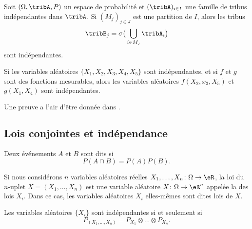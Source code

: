 \begin{lemma}  \label{LemHOjqqw}
    Soit \( (\Omega,\tribA,P)\) un espace de probabilité et \( (\tribA)_{i\in I}\) une famille de tribus indépendantes dans \( \tribA\). Si \( (M_j)_{j\in J}\) est une partition de \( I\), alors les tribus
    \begin{equation}
        \tribB_j=\sigma\big( \bigcup_{i\in M_j}\tribA_i \big)
    \end{equation}
    sont indépendantes.

    Si les variables aléatoires \( \{ X_1,X_2,X_3,X_4,X_5 \}\) sont indépendantes, et si \( f\) et \( g\) sont des fonctions mesurables, alors les variables aléatoires \( f(X_2,x_3,X_5)\) et \( g(X_1,X_4)\) sont indépendantes.
\end{lemma}
Une preuve a l'air d'être donnée dans \cite{VincentBa}.

\subsection{Lois conjointes et indépendance}

\begin{definition}
    Deux événements \( A\) et \( B\) sont dits  si
    \begin{equation}
        P(A\cap B)=P(A)P(B).
    \end{equation}
\end{definition}
Si nous considérons \( n\) variables aléatoires réelles \( X_1,\ldots,X_n\colon\Omega\to\eR\), la loi du \( n\)-uplet \( X=(X_1,\ldots,X_n)\) est une variable aléatoire \( X\colon \Omega\to \eR^n\) appelée la  des lois \( X_i\). Dans ce cas, les variables aléatoires \( X_i\) elles-mêmes sont dites lois  de \( X\).

\begin{proposition}     \label{PropPXXXPXPXPX}
    Les variables aléatoires \( \{ X_i \}\) sont indépendantes si et seulement si
    \begin{equation}
        P_{(X_1,\ldots,X_n)}=P_{X_1}\otimes\ldots\otimes P_{X_n}.
    \end{equation}
\end{proposition}

